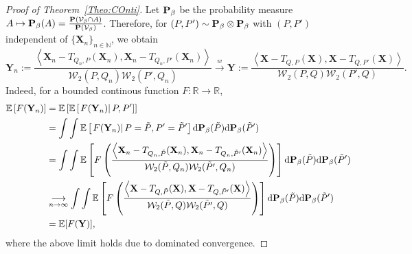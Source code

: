 \documentclass{imsart}
\numberwithin{equation}{section}
\def\N{\mathbb{N}}
\def\R{\mathbb{R}}
\def\E{\mathbb{E}}
\def\X{\mathbf{X}}
\def\Y{\mathbf{Y}}
\def\E{\mathbb E}
\def\N{\mathbb N}
\begin{document}
\begin{proof}[Proof of Theorem~\ref{Theo:COnti}]
	Let ${\bf P}_\beta$ be the probability measure  $A\mapsto {\bf P}_\beta(A)= \frac{{\bf P}(\mathcal{V}_\beta\cap A)}{ {\bf P}(\mathcal{V}_\beta)}$.
	Therefore, for $(P,P')\sim {\bf P}_\beta\otimes {\bf P}_\beta$ with $({P},P')$ independent of $ \{\X_n\}_{n\in \N} $, we obtain 
	$$
	{\Y}_n:= \frac{ \left\langle\X_n-T_{Q_{n} ,P}(\X_n), \X_n-T_{Q_{n} ,P'}(\X_n)  \right\rangle}{\mathcal{W}_2(P,Q_{n}) \mathcal{W}_2(P',Q_{n})}\xrightarrow{w} {\Y}:=\frac{ \left\langle \X-T_{Q ,P}(\X), \X-T_{Q ,P'}(\X)  \right\rangle}{\mathcal{W}_2(P,Q) \mathcal{W}_2(P',Q)}.
	$$
	Indeed, for a bounded continous function $F: \R \to \R$,
	\begin{align*}
		\E \left[ 
		F({\Y}_n)
		\right]
		&= 
		\E \left[ 
		\E \left[ 
		\left.
		F({\Y}_n)
		\right| 
		P,P'
		\right]
		\right]
		\\
		&=  \int 
		\int 
		\E \left[ 
		\left.
		F({\Y}_n)
		\right| 
		P=\tilde{P},P'=\tilde{P}'
		\right]
		\mathrm{d} {\bf P}_\beta(\tilde{P})
		\mathrm{d} {\bf P}_\beta(\tilde{P}')
		\\ 
		&= 
		\int 
		\int 
		\E \left[ 
		F
		\left(  
		\frac{ \left\langle\X_n-T_{Q_{n} ,\tilde{P}}(\X_n), \X_n-T_{Q_{n} ,\tilde{P}'}(\X_n)  \right\rangle}{\mathcal{W}_2(\tilde{P},Q_{n}) \mathcal{W}_2(\tilde{P}',Q_{n})}
		\right)
		\right]
		\mathrm{d} {\bf P}_\beta(\tilde{P})
		\mathrm{d} {\bf P}_\beta(\tilde{P}')
		\\
		&\underset{n \to \infty}{\longrightarrow} 
		\int 
		\int 
		\E \left[ 
		F
		\left(  
		\frac{ \left\langle\X-T_{Q ,\tilde{P}}(\X), \X-T_{Q ,\tilde{P}'}(\X)  \right\rangle}{\mathcal{W}_2(\tilde{P},Q) \mathcal{W}_2(\tilde{P}',Q)}
		\right)
		\right]
		\mathrm{d} {\bf P}_\beta(\tilde{P})
		\mathrm{d} {\bf P}_\beta(\tilde{P}')
		\\
		&= 
		\E[F(\Y)],
	\end{align*}
	where the above limit holds due to dominated convergence.
	

\end{proof}
\end{document}
